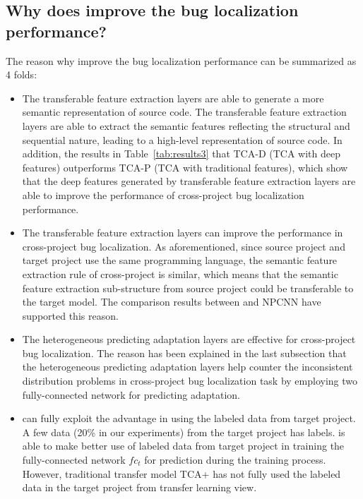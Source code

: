 \subsection{Why does \TRANPCNN improve the bug localization performance?}
The reason why \TRANPCNN improve the bug localization performance can be summarized as 4 folds:
\begin{itemize}
\item The transferable feature extraction layers are able to generate a more semantic representation of source code. The transferable feature extraction layers are able to extract the semantic features reflecting the structural and sequential nature, leading to a high-level representation of source code. In addition, the results in Table~\ref{tab:results3} that TCA-D (TCA with deep features) outperforms TCA-P (TCA with traditional features), which show that the deep features generated by transferable feature extraction layers are able to improve the performance of cross-project bug localization performance. 
\item The transferable feature extraction layers can improve the performance in cross-project bug localization. As aforementioned, since source project and target project use the same programming language, the semantic feature extraction rule of cross-project is similar, which means that the semantic feature extraction sub-structure from source project could be transferable to the target model. The comparison results between \TRANPCNN and NPCNN have supported this reason. 
\item The heterogeneous predicting adaptation layers are effective for cross-project bug localization. The reason has been explained in the last subsection that the heterogeneous predicting adaptation layers help counter the inconsistent distribution problems in cross-project bug localization task by employing two fully-connected network for predicting adaptation.
\item \TRANPCNN can fully exploit the advantage in using the labeled data from target project. A few data (20\% in our experiments) from the target project has labels. \TRANPCNN is able to make better use of labeled data from target project in training the fully-connected network $fc_t$ for prediction during the training process. However, traditional transfer model TCA+ has not fully used the labeled data in the target project from transfer learning view. 
\end{itemize}



